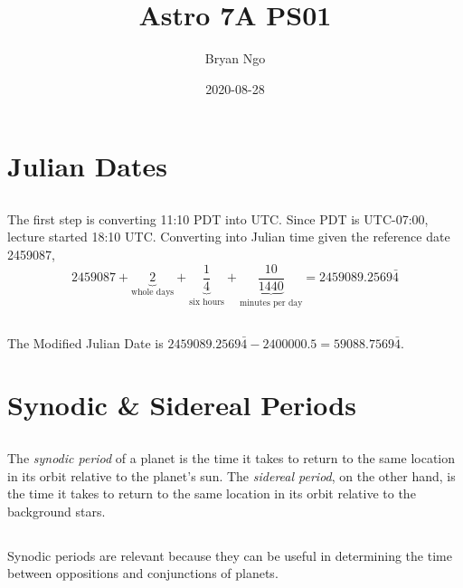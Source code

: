 \documentclass{article}
\title{Astro 7A PS01}
\author{Bryan Ngo}
\date{2020-08-28}
\begin{document}
\maketitle

\section{Julian Dates}

\subsection{}

The first step is converting 11:10 PDT into UTC.
Since PDT is UTC-07:00, lecture started 18:10 UTC.
Converting into Julian time given the reference date 2459087,
\begin{equation}
    2459087 + \underbrace{2}_{\text{whole days}} + \underbrace{\frac{1}{4}}_{\text{six hours}} + \underbrace{\frac{10}{1440}}_{\text{minutes per day}} = 2459089.2569\bar{4}
\end{equation}

\subsection{}

The Modified Julian Date is \(2459089.2569\bar{4} - 2400000.5 = 59088.7569\bar{4}\).

\section{Synodic \& Sidereal Periods}

\subsection{}

The \emph{synodic period} of a planet is the time it takes to return to the same location in its orbit relative to the planet's sun.
The \emph{sidereal period}, on the other hand, is the time it takes to return to the same location in its orbit relative to the background stars.

\subsection{}

Synodic periods are relevant because they can be useful in determining the time between oppositions and conjunctions of planets.
\end{document}
